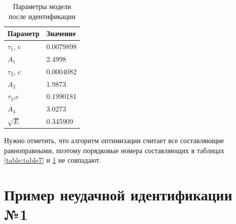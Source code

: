 \documentclass{report}
\begin{document}
        \begin{table}[ht]
            \caption{Параметры модели после идентификации}
            \label{table:table8}
            \centering
            \begin{tabular}{ | l | l | }
                \hline
                Параметр & Значение \\
                \hline
                $\tau_1$, c & 0.0079898 \\
                $A_1$ & 2.4998 \\
                \hline
                $\tau_2$, c & 0.0004082 \\
                $A_2$ & 1.9873 \\
                \hline
                $\tau_3$,c & 0.1990181 \\
                $A_3$ & 3.0273 \\
                \hline
                $\sqrt{E}$ & 0.345909 \\
                \hline
            \end{tabular}
        \end{table}


        Нужно отметить, что алгоритм оптимизации считает все составляющие равноправными, 
        поэтому порядковые номера составляющих в таблицах \ref{table:table7} и 
        \ref{table:table8} не совпадают.


        \section{Пример неудачной идентификации №1}
        

    
    \printbibliography
\end{document}
